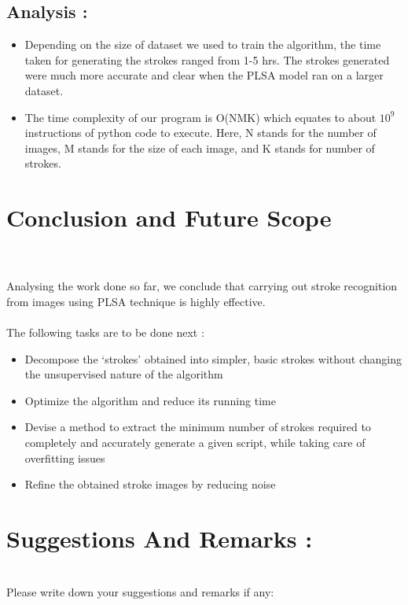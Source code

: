\documentclass[10pt]{article}
\begin{document}
		\subsection{Analysis :}
			\begin{itemize}
				\item 
				Depending on the size of dataset we used to train the algorithm, the time taken for generating the strokes ranged from 1-5 hrs. The strokes generated were much more accurate and clear when the PLSA model ran on a larger dataset.
				\item
				The time complexity of our program is O(NMK) which equates to about $10^{9}$ instructions of python code to execute. Here, N stands for the number of images, M stands for the size of each image, and K stands for number of strokes.
			\end{itemize}
	\newpage
	\section{Conclusion and Future Scope}
		\hrulefill \\\\
		Analysing the work done so far, we conclude that carrying out stroke recognition from images using PLSA technique is highly effective.\\\\The following tasks are to be done next :
		\begin{itemize}
			\item 
			Decompose the ‘strokes’ obtained into simpler, basic strokes without changing the unsupervised nature of the algorithm
			\item
			Optimize the algorithm and reduce its running time
			\item
			Devise a method to extract the minimum number of strokes required to completely and accurately generate a given script, while taking care of overfitting issues
			\item
			Refine the obtained stroke images by reducing noise
		\end{itemize}
	\newpage
	\printbibliography
	\newpage
	\section{Suggestions And Remarks :}
		\hrulefill\\
		\Large Please write down your suggestions and remarks if any:	
\end{document}

